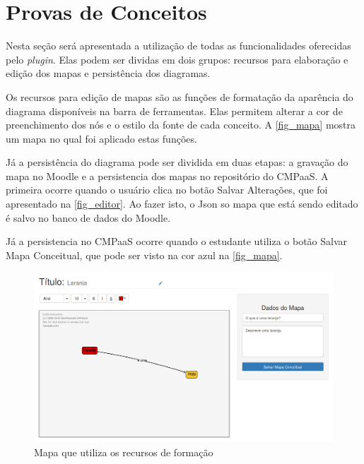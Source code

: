 \documentclass[
	12pt,				%
	openright,			%
	oneside,			%
	a4paper,			%
	english,			%
	french,				%
	spanish,			%
	brazil				%
	]{abntex2}
\begin{document}
\section{Provas de Conceitos}

Nesta seção será apresentada a utilização de todas as funcionalidades oferecidas pelo \textit{plugin}. Elas podem ser dividas em dois grupos: recursos para elaboração e edição dos mapas e persistência dos diagramas.

Os recursos para edição de mapas são as funções de formatação da aparência do diagrama disponíveis na barra de ferramentas. Elas permitem alterar a cor de preenchimento dos nós e o estilo da fonte de cada conceito. A \autoref{fig_mapa} mostra um mapa no qual foi aplicado estas funções.

Já a persistência do diagrama pode ser dividida em duas etapas: a gravação do mapa no Moodle e a persistencia dos mapas no repositório do CMPaaS. A primeira ocorre quando o usuário clica no botão Salvar Alterações, que foi apresentado na \autoref{fig_editor}. Ao fazer isto, o Json so mapa que está sendo editado é salvo no banco de dados do Moodle.
 
Já a persistencia no CMPaaS ocorre quando o estudante utiliza o botão Salvar Mapa Conceitual, que pode ser visto na cor azul na \autoref{fig_mapa}.

\begin{figure}[htb]
	\caption{\label{fig_mapa} Mapa que utiliza os recursos de formação}
	\begin{center}
		\includegraphics[scale=0.3]{mapa.png}
	\end{center}
\end{figure}


\end{document}
